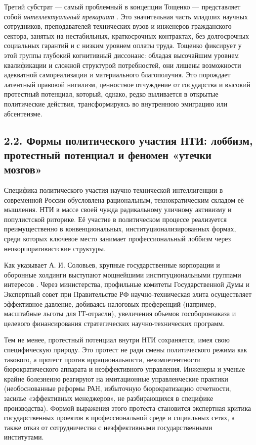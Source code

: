 Третий субстрат --- самый проблемный в концепции Тощенко --- представляет собой \textit{интеллектуальный прекариат} \cite{Toschenko}. Это значительная часть младших научных сотрудников, преподавателей технических вузов и инженеров гражданского сектора, занятых на нестабильных, краткосрочных контрактах, без долгосрочных социальных гарантий и с низким уровнем оплаты труда. Тощенко фиксирует у этой группы глубокий когнитивный диссонанс: обладая высочайшим уровнем квалификации и сложной структурой потребностей, они лишены возможности адекватной самореализации и материального благополучия. Это порождает латентный правовой нигилизм, ценностное отчуждение от государства и высокий протестный потенциал, который, однако, редко выливается в открытые политические действия, трансформируясь во внутреннюю эмиграцию или абсентеизме.

\subsection{2.2. Формы политического участия НТИ: лоббизм, протестный потенциал и феномен «утечки мозгов»}

Специфика политического участия научно-технической интеллигенции в современной России обусловлена рациональным, технократическим складом её мышления. НТИ в массе своей чужда радикальному уличному активизму и популистской риторике. Её участие в политическом процессе реализуется преимущественно в конвенциональных, институционализированных формах, среди которых ключевое место занимает профессиональный лоббизм через неокорпоративистские структуры. 

Как указывает А. И. Соловьев, крупные государственные корпорации и оборонные холдинги выступают мощнейшими институциональными группами интересов \cite{Solovyev}. Через министерства, профильные комитеты Государственной Думы и Экспертный совет при Правительстве РФ научно-техническая элита осуществляет эффективное давление, добиваясь налоговых преференций (например, масштабные льготы для IT-отрасли), увеличения объемов гособоронзаказа и целевого финансирования стратегических научно-технических программ.

Тем не менее, протестный потенциал внутри НТИ сохраняется, имея свою специфическую природу. Это протест не ради смены политического режима как такового, а протест против иррациональности, некомпетентности бюрократического аппарата и неэффективного управления. Инженеры и ученые крайне болезненно реагируют на имитационные управленческие практики (необоснованные реформы РАН, избыточную бюрократизацию отчетности, засилье «эффективных менеджеров», не разбирающихся в специфике производства). Формой выражения этого протеста становится экспертная критика государственных проектов в профессиональной среде и социальных сетях, а также отказ от сотрудничества с неэффективными государственными институтами.

